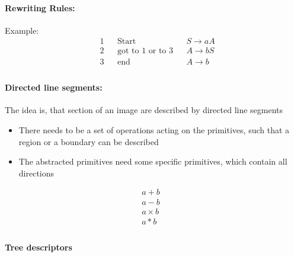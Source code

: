 \paragraph{Rewriting Rules:}
Example:
\begin{align*}
& 1 && \text{Start} && S \rightarrow aA\\
& 2 && \text{got to 1 or to 3} &&  A \rightarrow bS \\
& 3 && \text{end} &&  A \rightarrow b \\
\end{align*}
\paragraph{Directed line segments:} The idea is, that section of an image are described by directed line segments

\begin{itemize}
\item There needs to be a set of
operations acting on the
primitives, such that a region or a
boundary can be described
\item The abstracted primitives need
some specific primitives, which
contain all directions
\end{itemize}

\begin{align*}
& a+b &&\\
& a-b  &&\\
& a \times b &&\\
& a\ast b &&\\
\end{align*}

\paragraph{Tree descriptors}

